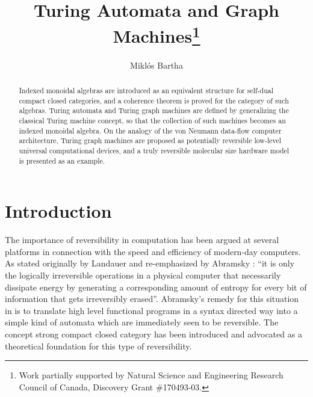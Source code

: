 \documentclass{eptcs}
\title{Turing Automata and Graph Machines\thanks{Work partially supported by Natural
Science and Engineering Research Council of Canada, Discovery Grant \#170493-03.}}
\author{Mikl\'os Bartha
\institute{Deprtment of Computer Science\\
Memorial University of Newfoundland\\
St.\ John's, NL, Canada}
\email{bartha@mun.ca}
}
\begin{document}
\maketitle

\begin{abstract}
Indexed monoidal algebras are introduced as an equivalent structure for
self-dual compact closed categories, and a coherence theorem is proved
for the category of such algebras. Turing automata and Turing graph machines 
are defined by generalizing the classical Turing machine concept, so that
the collection of such machines becomes an indexed monoidal algebra. 
On the analogy of the von Neumann data-flow computer architecture,
Turing graph machines are proposed as potentially reversible
low-level universal computational devices, and a truly reversible molecular 
size hardware model is presented as an example.
\end{abstract}
\section{Introduction}
The importance of reversibility in computation has been argued at several
platforms in connection with the speed and efficiency of modern-day computers.
As stated originally by Landauer \cite{landa} and re-emphasized by Abramsky \cite{abr}:
``it is only the logically irreversible operations in a physical computer that
necessarily dissipate energy by generating a corresponding amount of entropy
for every bit of information that gets irreversibly erased''. Abramsky's
remedy for this situation in \cite{abr} is to translate high level functional
programs in a syntax directed way into a simple kind of automata which are
immediately seen to be reversible. The concept strong compact closed 
category \cite{abst} has been introduced and advocated as a theoretical 
foundation for this type of reversibility.
\end{document}
